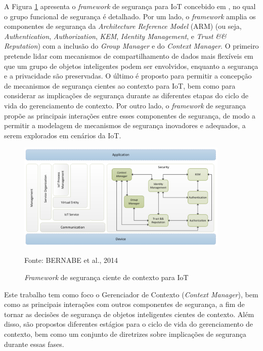 \documentclass[tid,table]{texufpel} %
\begin{document}
A Figura \ref{arm-framework} apresenta o \textit{framework} de segurança para IoT concebido em \cite{bernabe14}, no qual o grupo funcional de segurança é detalhado. Por um lado, o \textit{framework} amplia os componentes de segurança da \textit{Architecture Reference Model} (ARM) (ou seja, \textit{Authentication}, \textit{Authorization}, \textit{KEM}, \textit{Identity Management}, e \textit{Trust \&\& Reputation}) com a inclusão do \textit{Group Manager} e do \textit{Context Manager}. O primeiro pretende lidar com mecanismos de compartilhamento de dados mais flexíveis em que um grupo de objetos inteligentes podem ser envolvidos, enquanto a segurança e a privacidade são preservadas. O último é proposto para permitir a concepção de mecanismos de segurança cientes ao contexto para IoT, bem como para considerar as implicações de segurança durante as diferentes etapas do ciclo de vida do gerenciamento de contexto. Por outro lado, o \textit{framework} de segurança propõe as principais interações entre esses componentes de segurança, de modo a permitir a modelagem de mecanismos de segurança inovadores e adequados, a serem explorados em cenários da IoT.


\begin{figure}[ht!]
\centering
\includegraphics[width=0.9\textwidth]{imagens/arm-framework.png}
\caption{\textit{Framework} de segurança ciente de contexto para IoT}
\label{arm-framework}
Fonte: BERNABE et al., 2014
\end{figure}

Este trabalho tem como foco o Gerenciador de Contexto (\textit{Context Manager}), bem como as principais interações com outros componentes de segurança, a fim de tornar as decisões de segurança de objetos inteligentes cientes de contexto. Além disso, são propostos diferentes estágios para o ciclo de vida do gerenciamento de contexto, bem como um conjunto de diretrizes sobre implicações de segurança durante essas fases.
\end{document}
